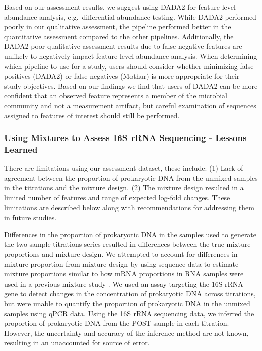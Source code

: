 \documentclass{bmcart}
\begin{document}
Based on our assessment results, we suggest using DADA2 for
feature-level abundance analysis, e.g.~differential abundance testing.
While DADA2 performed poorly in our qualitative assessment,
the pipeline performed better in the quantitative assessment compared to the other pipelines.
Additionally, the DADA2 poor qualitative assessment results due to
false-negative features are unlikely to negatively impact feature-level abundance analysis.
When determining which pipeline to use for a study, users should consider
whether minimizing false positives (DADA2) or false negatives (Mothur)
is more appropriate for their study objectives.
Based on our findings we find that users of DADA2 can be more
confident that an observed feature represents a member of the
microbial community and not a measurement artifact, but careful examination of sequences assigned to features of interest should still be performed.

\subsubsection*{Using Mixtures to Assess 16S rRNA Sequencing - Lessons Learned}

There are limitations using our assessment dataset, these include:
(1) Lack of agreement between the proportion of prokaryotic DNA from the
unmixed samples in the titrations and the mixture design.
(2) The mixture design resulted in a limited number of features and range of expected log-fold changes.
These limitations are described below along with
recommendations for addressing them in future studies.

Differences in the proportion of prokaryotic DNA in the samples used to
generate the two-sample titrations series resulted in differences
between the true mixture proportions and mixture design. We attempted to
account for differences in mixture proportion from mixture design by
using sequence data to estimate mixture proportions similar to how mRNA
proportions in RNA samples were used in a previous mixture study
\cite{parsons2015using}. We used an assay targeting the 16S rRNA gene
to detect changes in the concentration of prokaryotic DNA across
titrations, but were unable to quantify the proportion of prokaryotic
DNA in the unmixed samples using qPCR data. Using the 16S rRNA sequencing
data, we inferred the proportion of prokaryotic DNA from the POST sample
in each titration. However, the uncertainty and accuracy of the
inference method are not known, resulting in an unaccounted for source of error.
\end{document}
